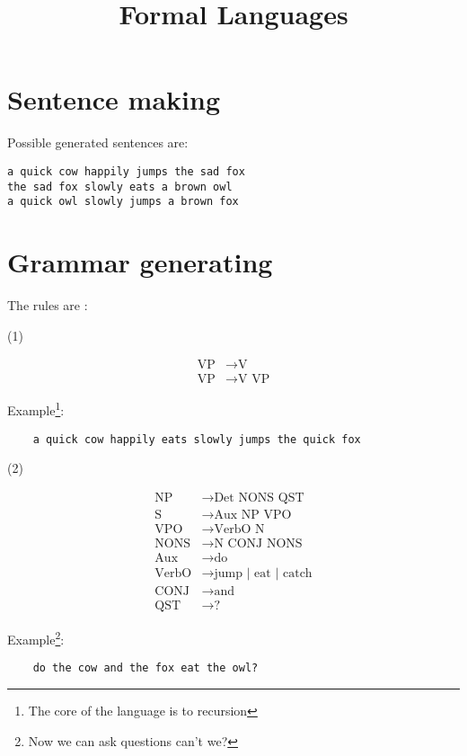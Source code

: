 \documentclass[a4paper, justified]{tufte-handout}
\title{Formal Languages}
\begin{document}
\maketitle
\usetikzlibrary{automata, positioning, arrows}
\section{Sentence making}

Possible generated sentences are:  
\begin{verbatim}
a quick cow happily jumps the sad fox
the sad fox slowly eats a brown owl
a quick owl slowly jumps a brown fox

\end{verbatim}

\section{Grammar generating}

The rules are :

(1)


\begin{align}
    \text{VP}& \rightarrow \text{V} \\
    \text{VP}& \rightarrow \text{V  VP}
\end{align}

Example\footnote{The core of the language is to recursion}: 
\begin{verbatim}
    a quick cow happily eats slowly jumps the quick fox
\end{verbatim} 

(2)

\begin{align}
    \text{NP} &\rightarrow \text{Det NONS QST}\\
    \text{S} &\rightarrow \text{Aux NP VPO} \\
    \text{VPO} &\rightarrow \text{VerbO N}\\
    \text{NONS} &\rightarrow \text{N CONJ NONS}\\
    \text{Aux} &\rightarrow \text{do}\\
    \text{VerbO} &\rightarrow \text {jump | eat | catch}\\
    \text{CONJ} &\rightarrow \text{and}\\
    \text{QST} &\rightarrow \texttt{?}
\end{align}

Example\footnote{Now we can ask questions can't we? }: 

\begin{verbatim}
    do the cow and the fox eat the owl?
\end{verbatim}
\end{document}
